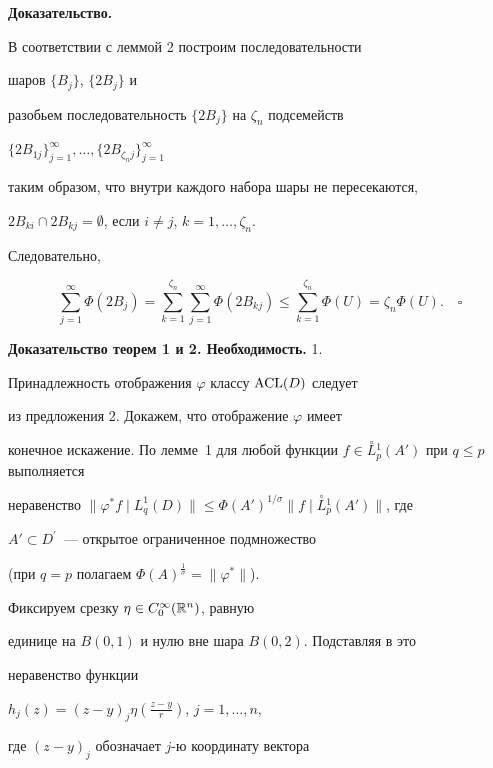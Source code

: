 {\bf Доказательство.}


В соответствии с леммой 2 построим последовательности


шаров $\{B_j\}$, $\{2B_j\}$ и


разобьем последовательность $\{2B_j\}$ на $\zeta_n$ подсемейств


$\{2B_{1j}\}_{j=1}^{\infty}, \dotsc, \{2B_{\zeta_nj}\}_{j=1}^{\infty}$


таким образом, что внутри каждого набора шары не пересекаются,


$2B_{ki}\cap 2B_{kj}=\emptyset$, если $i\ne j$, $k=1,\dotsc,\zeta_n$.


Следовательно,


$$


\sum_{j=1}^{\infty}\Phi(2B_j)=


\sum_{k=1}^{\zeta_n}\sum\limits_{j=1}^{\infty}\Phi(2B_{kj})\leq


\sum_{k=1}^{\zeta_n}\Phi(U)={\zeta_n}\Phi(U).\quad\square


$$





{\bf Доказательство теорем 1 и 2. Необходимость.} 1.


Принадлежность отображения $\varphi$ классу $\operatorname{ACL}(D)$ следует


из предложения 2. Докажем, что отображение $\varphi$ имеет


конечное искажение. По лемме~1 для любой функции $f\in


\overset{\circ}{L}{}_{p}^{1}(A')$ при $q\leq p$ выполняется


неравенство $\|\varphi^{\ast} f\mid{L}_{q}^{1}(D)\|


\leq\Phi(A')^{1/\sigma}


\|f\mid\overset{\circ}{L}{}_{p}^{1}(A')\|$, где


$A'\subset D^{\prime}$~--- открытое ограниченное подмножество


(при $q=p$ полагаем $\Phi(A)^{\frac{1}{\sigma}}=\|\varphi^*\|$).


Фиксируем срезку $\eta\in C_{0}^{\infty}({\Bbb R}^n)$, равную


единице на $B(0,1)$ и нулю вне шара $B(0,2)$. Подставляя в это


неравенство функции


$h_{j}(z)=(z-y)_{j}\eta(\frac{z-y}{r})$, $j=1,\dotsc,n$,


где $(z-y)_{j}$ обозначает $j$-ю координату вектора


